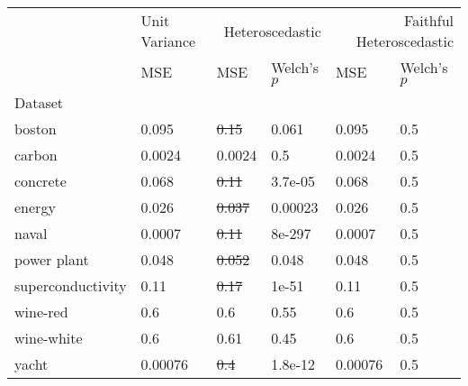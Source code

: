 \begin{tabular}{l|l|ll|ll}
\toprule
 & Unit Variance & \multicolumn{2}{r}{Heteroscedastic} & \multicolumn{2}{r}{Faithful Heteroscedastic} \\
 & MSE & MSE & Welch's $p$ & MSE & Welch's $p$ \\
Dataset &  &  &  &  &  \\
\midrule
boston & 0.095 & \sout{0.15} & 0.061 & 0.095 & 0.5 \\
carbon & 0.0024 & 0.0024 & 0.5 & 0.0024 & 0.5 \\
concrete & 0.068 & \sout{0.11} & 3.7e-05 & 0.068 & 0.5 \\
energy & 0.026 & \sout{0.037} & 0.00023 & 0.026 & 0.5 \\
naval & 0.0007 & \sout{0.11} & 8e-297 & 0.0007 & 0.5 \\
power plant & 0.048 & \sout{0.052} & 0.048 & 0.048 & 0.5 \\
superconductivity & 0.11 & \sout{0.17} & 1e-51 & 0.11 & 0.5 \\
wine-red & 0.6 & 0.6 & 0.55 & 0.6 & 0.5 \\
wine-white & 0.6 & 0.61 & 0.45 & 0.6 & 0.5 \\
yacht & 0.00076 & \sout{0.4} & 1.8e-12 & 0.00076 & 0.5 \\
\bottomrule
\end{tabular}
